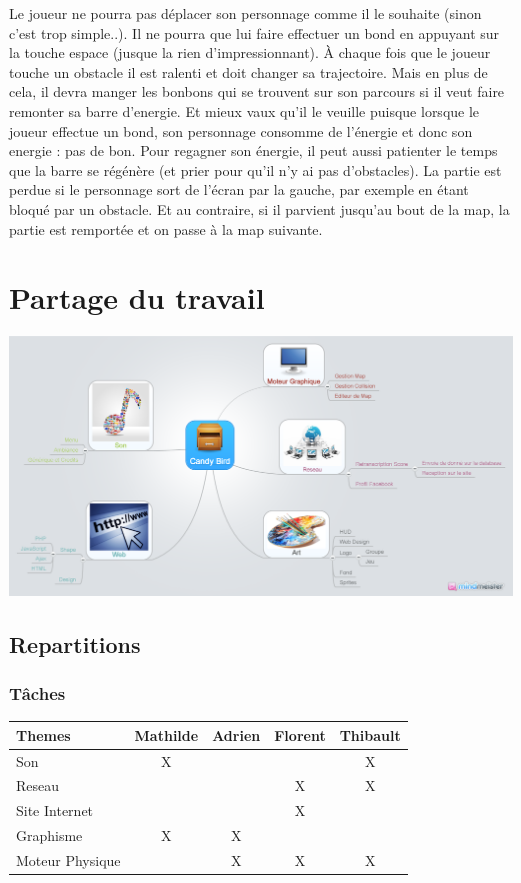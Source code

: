 \documentclass [11pt]{report}
\begin{document}
\indent Le joueur ne pourra pas déplacer son personnage comme il le souhaite (sinon c'est trop simple..). Il ne pourra que lui faire effectuer un bond en appuyant sur la touche espace (jusque la rien d'impressionnant). \`A chaque fois que le joueur touche un obstacle il est ralenti et doit changer sa trajectoire. Mais en plus de cela, il devra manger les bonbons qui se trouvent sur son parcours si il veut faire remonter sa barre d'energie. Et mieux vaux qu'il le veuille puisque lorsque le joueur effectue un bond, son personnage consomme de l'énergie et donc son energie : pas de bon. Pour regagner son énergie, il peut aussi patienter le temps que la barre se régénère (et prier pour qu'il n'y ai pas d'obstacles). La partie est perdue si le personnage sort de l'écran par la gauche, par exemple en étant bloqué par un obstacle. Et au contraire, si il parvient jusqu'au bout de la map, la partie est remportée et on passe à la map suivante.
\newpage 


\chapter {Partage du travail}
\begin{center}
\includegraphics[scale=0.3]{images/Candy_Bird.png}
\end{center}

\newpage 

	\section{Repartitions}
		\subsection{Tâches}
			\begin{tabular}{| l |*{4} {c|}}
				\hline
				Themes & Mathilde & Adrien & Florent & Thibault \\
				\hline
				Son & X & & & X \\
				\hline
				Reseau & & & X & X \\
				\hline
				Site Internet & & & X & \\
				\hline
				Graphisme & X & X & & \\
				\hline
				Moteur Physique & & X & X & X\\
				\hline
			\end{tabular}\\\vspace{3mm}
\end{document}
